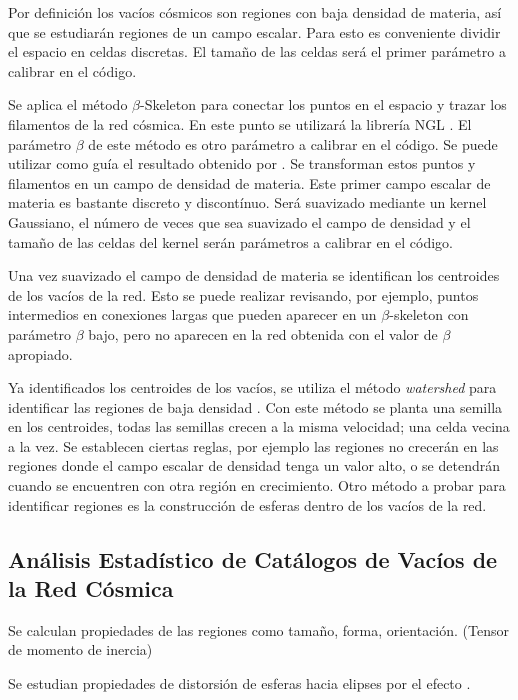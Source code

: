 \documentclass[preprint]{aastex62}
\begin{document}
  Por definición los vacíos cósmicos son regiones con baja densidad de materia, así que se
  estudiarán regiones de un campo escalar. Para esto es conveniente dividir el espacio en
  celdas discretas. El tamaño de las celdas será el primer parámetro a calibrar en el código.
  
  Se aplica el método $\beta$-Skeleton para conectar los puntos en el espacio y trazar los
  filamentos de la red cósmica. En este punto se utilizará la librería NGL \citep{ngl}.
  El parámetro $\beta$ de este método es otro parámetro a calibrar en el código. Se puede
  utilizar como guía el resultado obtenido por \citet{Fang2018}.
  Se transforman estos puntos y filamentos en un campo de densidad de materia. Este primer
  campo escalar de materia es bastante discreto y discontínuo. Será suavizado mediante un
  kernel Gaussiano, el número de veces que sea suavizado el campo de densidad y el tamaño de
  las celdas del kernel serán parámetros a calibrar en el código.

  Una vez suavizado el campo de densidad de materia se identifican los centroides
  de los vacíos de la red. Esto se puede realizar revisando, por ejemplo, puntos intermedios
  en conexiones largas que pueden aparecer en un $\beta$-skeleton con parámetro $\beta$ bajo,
  pero no aparecen en la red obtenida con el valor de $\beta$ apropiado.

  Ya identificados los centroides de los vacíos, se utiliza el método \textit{watershed}
  para identificar las regiones de baja densidad \citep{Sutter2015}. Con este método
  se planta una semilla en los centroides, todas las semillas crecen a la misma velocidad; una
  celda vecina a la vez. Se establecen ciertas reglas, por ejemplo las regiones no crecerán en
  las regiones donde el campo escalar de densidad tenga un valor alto, o se detendrán cuando
  se encuentren con otra región en crecimiento. Otro método a probar para identificar regiones
  es la construcción de esferas dentro de los vacíos de la red. 

  \subsection{Análisis Estadístico de Catálogos de Vacíos de la Red Cósmica}

  Se calculan propiedades de las regiones como tamaño, forma, orientación. (Tensor de momento de inercia) \citep{El-Ad1997}

  Se estudian propiedades de distorsión de esferas hacia elipses por el efecto \citet{AlcockPaczynski1979}.
\end{document}
